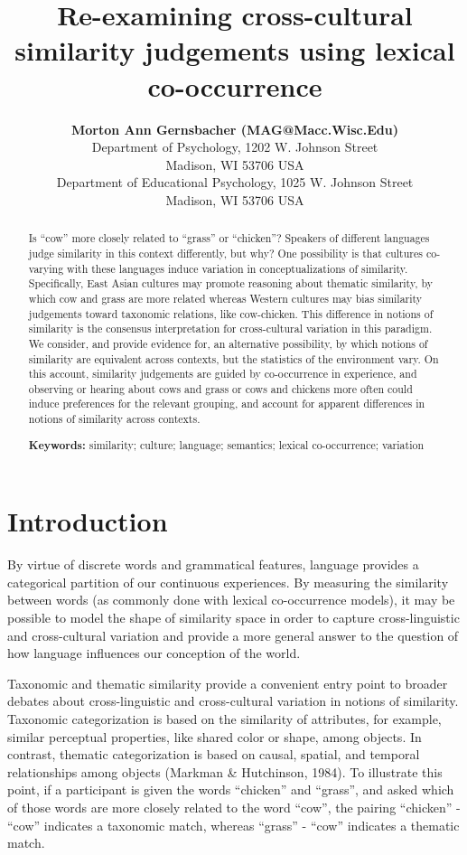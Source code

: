 \documentclass[10pt, letterpaper]{article}
\title{Re-examining cross-cultural similarity judgements using lexical
co-occurrence}
\author{{\large \bf Morton Ann Gernsbacher (MAG@Macc.Wisc.Edu)} \\ Department of Psychology, 1202 W. Johnson Street \\ Madison, WI 53706 USA \AND {\large \bf Sharon J.~Derry (SDJ@Macc.Wisc.Edu)} \\ Department of Educational Psychology, 1025 W. Johnson Street \\ Madison, WI 53706 USA}
\begin{document}
\maketitle

\begin{abstract}
Is ``cow'' more closely related to ``grass'' or ``chicken''? Speakers of
different languages judge similarity in this context differently, but
why? One possibility is that cultures co-varying with these languages
induce variation in conceptualizations of similarity. Specifically, East
Asian cultures may promote reasoning about thematic similarity, by which
cow and grass are more related whereas Western cultures may bias
similarity judgements toward taxonomic relations, like cow-chicken. This
difference in notions of similarity is the consensus interpretation for
cross-cultural variation in this paradigm. We consider, and provide
evidence for, an alternative possibility, by which notions of similarity
are equivalent across contexts, but the statistics of the environment
vary. On this account, similarity judgements are guided by co-occurrence
in experience, and observing or hearing about cows and grass or cows and
chickens more often could induce preferences for the relevant grouping,
and account for apparent differences in notions of similarity across
contexts.

\textbf{Keywords:}
similarity; culture; language; semantics; lexical co-occurrence;
variation
\end{abstract}

\hypertarget{introduction}{%
\section{Introduction}\label{introduction}}

By virtue of discrete words and grammatical features, language provides
a categorical partition of our continuous experiences. By measuring the
similarity between words (as commonly done with lexical co-occurrence
models), it may be possible to model the shape of similarity space in
order to capture cross-linguistic and cross-cultural variation and
provide a more general answer to the question of how language influences
our conception of the world.

Taxonomic and thematic similarity provide a convenient entry point to
broader debates about cross-linguistic and cross-cultural variation in
notions of similarity. Taxonomic categorization is based on the
similarity of attributes, for example, similar perceptual properties,
like shared color or shape, among objects. In contrast, thematic
categorization is based on causal, spatial, and temporal relationships
among objects (Markman \& Hutchinson, 1984). To illustrate this point,
if a participant is given the words ``chicken'' and ``grass'', and asked
which of those words are more closely related to the word ``cow'', the
pairing ``chicken'' - ``cow'' indicates a taxonomic match, whereas
``grass'' - ``cow'' indicates a thematic match.
\end{document}
